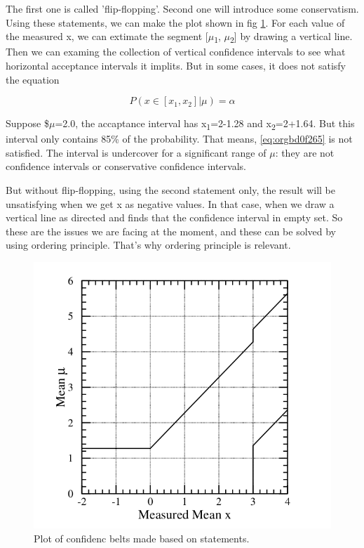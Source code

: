 \documentclass[a4paper,11pt]{article}
\begin{document}
The first one is called 'flip-flopping'. Second one will introduce some conservatism. Using these statements, we can make the plot shown in fig \ref{fig:orgee24ce3}. For each value of the measured x, we can extimate the segment [\(\mu\)\textsubscript{1}, \(\mu\)\textsubscript{2}] by drawing a vertical line. Then we can examing the collection of vertical confidence intervals to see what horizontal acceptance intervals it implits. But in some cases, it does not satisfy the equation

\begin{equation}
\label{eq:orgbd0f265}
P(x\in[x_1, x_2]|\mu)=\alpha
\end{equation}

Suppose \$\(\mu\)=2.0, the accaptance interval has x\textsubscript{1}=2-1.28 and x\textsubscript{2}=2+1.64. But this interval only contains 85\% of the probability. That means, \ref{eq:orgbd0f265} is not satisfied. The interval is undercover for a significant range of \(\mu\): they are not confidence intervals or conservative confidence intervals.

But without flip-flopping, using the second statement only, the result will be unsatisfying when we get x as negative values. In that case, when we draw a vertical line as directed and finds that the confidence interval in empty set. So these are the issues we are facing at the moment, and these can be solved by using ordering principle. That's why ordering principle is relevant.
\begin{figure}[htbp]
\centering
\includegraphics[width=.9\linewidth]{fig_4.png}
\caption{\label{fig:orgee24ce3}Plot of confidenc belts made based on statements. \cite{1998}}
\end{figure}
\end{document}
